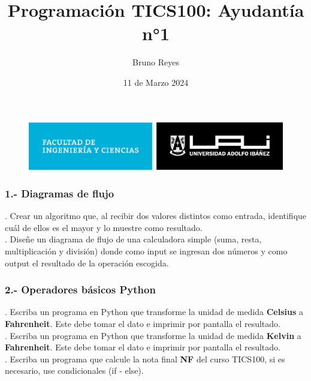 \documentclass{article}
\begin{document}
\begin{figure}
    \centering
    \includegraphics[width=0.7\linewidth]{../img/facultad-de-ingenieria-y-ciencias.png} 
\end{figure}

\title{Programación TICS100: Ayudantía n°1}
\author{Bruno Reyes}
\date{11 de Marzo 2024}


\maketitle


\subsubsection*{1.- Diagramas de flujo}

. Crear un algoritmo que, al recibir dos valores distintos como entrada, identifique cuál de ellos es el mayor y lo muestre como resultado.\\

. Diseñe un diagrama de flujo de una calculadora simple (suma, resta, multiplicación y división) donde como input se ingresan dos números y como output el resultado de la operación escogida. \\

\subsubsection*{2.- Operadores básicos Python}

. Escriba un programa en Python que transforme la unidad de medida \textbf{Celsius} a \textbf{Fahrenheit}. Este debe tomar el dato e imprimir por pantalla el resultado.\\

. Escriba un programa en Python que transforme la unidad de medida \textbf{Kelvin} a \textbf{Fahrenheit}. Este debe tomar el dato e imprimir por pantalla el resultado.\\

. Escriba un programa que calcule la nota final \textbf{NF} del curso TICS100, si es necesario, use condicionales (if - else).  \\
\end{document}
